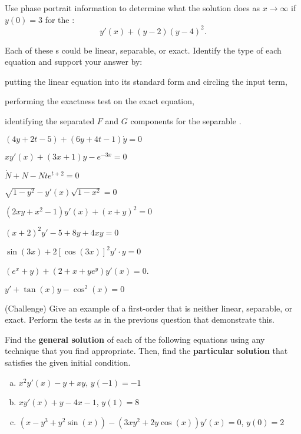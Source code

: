 \begin{question}
  Use phase portrait information to determine what the solution does as \(x \to \infty\) if \(y(0) = 3\) for the \ode{}:\\
    \[
      y'(x) + (y-2)(y-4)^{2}.
    \]
\end{question}


\begin{question}
Each of these \ode{}s could be linear, separable, or exact. Identify the type of each equation and support your answer by:
  \begin{compactitem}
  \item putting the linear equation into its standard form and circling the input term,
  \item performing the exactness test on the exact equation,
    \item identifying the separated \(F\) and \(G\) components for the separable \ode{}.
    \end{compactitem}

      \begin{colenumerate}
      \item \((4y + 2t - 5) + (6y + 4t - 1)\dot y = 0\)
      \item \(x y'(x) + (3x+1)y - e^{-3x} = 0\)
    \item \(\dot N + N - N t e^{t+2} = 0\)
    \item \(\sqrt{1-y^{2}} - y'(x)\sqrt{1-x^{2}} = 0\)
    \item \( (2xy + x^{2} - 1)y'(x) + (x+y)^{2}= 0\)
    \item \( (x+2)^2 y' - 5 + 8y + 4xy = 0\)
    \item \(\sin(3x) + 2 [ \cos(3x) ]^{2} y' \cdot y = 0\)
    \item \((e^{x} + y) + (2+x+ye^{y})y'(x) = 0\).
    \item \( y' + \tan(x) y - \cos^{2}(x) = 0\)
    \end{colenumerate}
\end{question}


\begin{question}
(Challenge) Give an example of a first-order \ode{} that is neither linear, separable, or exact. Perform the tests as in the previous question that demonstrate this.
\end{question}

\begin{question}
 Find the \textbf{general solution} of each of the following equations using any technique that you find appropriate. Then, find the \textbf{particular solution} that satisfies the given initial condition.
  \begin{enumerate}[(a)]
    \item \(x^{2} y'(x) - y + xy\), \(y(-1) = -1\)
    \item \(x y'(x) + y - 4x - 1\), \(y(1) = 8\)
    \item \( (x-y^3+y^2\sin(x)) - (3xy^{2} + 2y\cos(x))y'(x) = 0 \), \(y(0) = 2\)
  \end{enumerate}
\end{question}

